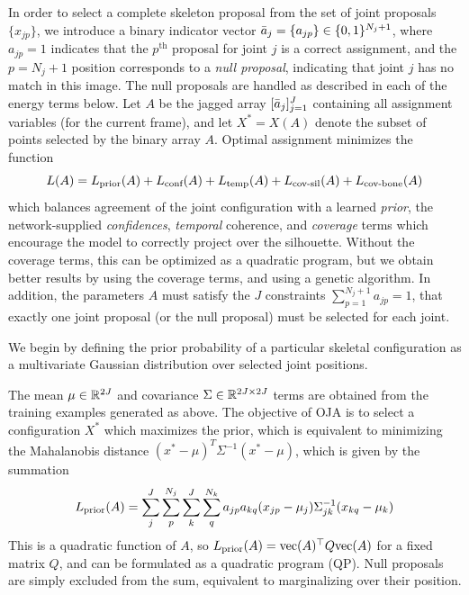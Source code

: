 In order to select a complete skeleton proposal from the set of joint proposals $\{x_{jp}\}$, we introduce a binary indicator vector $\bar{a}_j = \{a_{jp}\} \in \{0, 1\}^{N_j+1}$, where $a_{jp} = 1$ indicates that the $p^\text{th}$ proposal for joint $j$ is a correct assignment, and the $p = N_j+1$ position corresponds to a {\em null proposal}, indicating that joint $j$ has no match in this image.
The null proposals are handled as described in each of the energy terms below.
Let $A$ be the jagged array $[\bar{a}_j]_{j=1}^J$ containing all assignment variables (for the current frame), and let $X^* = X(A)$ denote the subset of points selected by the binary array $A$.   
Optimal assignment minimizes the function
\begin{equation}
L(A) = L_{\textrm{prior}}(A) + L_{\textrm{conf}}(A) + L_{\textrm{temp}}(A) + L_{\textrm{cov-sil}}(A) + L_{\textrm{cov-bone}}(A)
\end{equation}
which balances agreement of the joint configuration with a learned {\em prior}, the network-supplied {\em confidences}, {\em temporal} coherence, and {\em coverage} terms which encourage the model to correctly project over the silhouette.   Without the coverage terms, this can be optimized as a quadratic program, but we obtain better results by using the coverage terms, and using a genetic algorithm.  In addition, the parameters $A$ must satisfy the $J$ constraints $\sum_{p=1}^{N_j+1} a_{jp} = 1$, that exactly one joint proposal (or the null proposal) must be selected for each joint.


 We begin by defining the prior probability of a particular skeletal configuration as a multivariate Gaussian distribution over selected joint positions.

The mean $\mu \in {\mathbb{R}^{2J}}$ and covariance $\Sigma \in {\mathbb{R}^{2J\times 2J}}$ terms are obtained from the training examples generated as above. The objective of OJA is to select a configuration $X^*$ which maximizes the prior, which is equivalent to minimizing the Mahalanobis distance
$(x^*-\mu)^T\Sigma^{-1}(x^*-\mu)$, which is given by the summation
\begin{equation}
L_{\textrm{prior}}(A) = \sum_j^J\sum_p^{N_j}\sum_k^J\sum_q^{N_k}a_{jp}a_{kq}(x_{jp} - \mu_j)\Sigma_{jk}^{-1}(x_{kq}-\mu_k)
\end{equation}
This is a quadratic function of $A$, so $L_{\textrm{prior}}(A) = \text{vec}(A)^\top Q \text{vec}(A)$ for a fixed matrix $Q$, and can be formulated as a quadratic program (QP).  Null proposals are simply excluded from the sum, equivalent to marginalizing over their position. 

